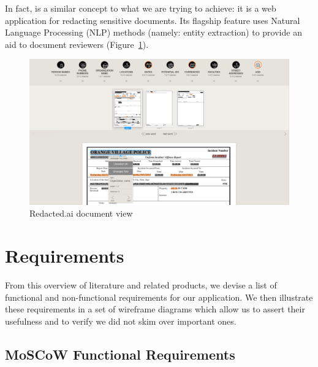 \documentclass[\version]{l4proj}
\begin{document}
In fact, \textcite{RedactedAIRemovea} is a similar concept to what we are trying to achieve: it is a web application for redacting sensitive documents. Its flagship feature uses Natural Language Processing (NLP) methods (namely: entity extraction) to provide an aid to document reviewers (Figure~\ref{fig:redactedai}).

\begin{figure}[H]
    \centering
    \includegraphics[width=0.9\linewidth]{images/related_products/redactedai.png}
    \caption{Redacted.ai document view}\label{fig:redactedai}
\end{figure}

\chapter{Requirements}

From this overview of literature and related products, we devise a list of functional and non-functional requirements for our application.
We then illustrate these requirements in a set of wireframe diagrams which allow us to assert their usefulness and to verify we did not skim over important ones.

\section{MoSCoW Functional Requirements}
\end{document}
